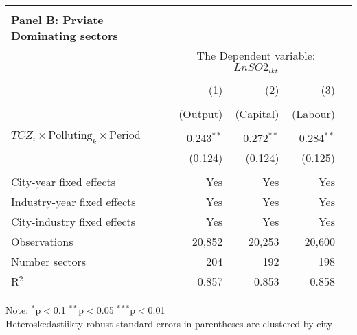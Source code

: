 \documentclass[12pt]{article}
\begin{document}
\begin{table}[!htb]
\begin{adjustbox}{width=\textwidth, totalheight=\baselineskip,keepaspectratio}
\begin{tabular}{lrrrr}
        \bottomrule
        \\ %
        \multicolumn{1}{l}{\textbf{Panel B: Prviate Dominating sectors}} \\
        \toprule
        & \multicolumn{3}{c}{The Dependent variable: $Ln SO2_{ikt}$} \\
        \cline{2-4}
        \\[-1.8ex] & (1) & (2) & (3)\\
        \\[-1.8ex] &  (Output)& (Capital) & (Labour) \\
        \hline \\[-1.8ex]
        $TCZ_i \times \text{Polluting}_k \times \text{Period}$ & $-$0.243$^{**}$ & $-$0.272$^{**}$ & $-$0.284$^{**}$ \\
                                                            & (0.124)         & (0.124)         & (0.125)         \\
        \hline \\[-1.8ex]
        City-year fixed effects                             & Yes             & Yes             & Yes             \\
        Industry-year fixed effects                         & Yes             & Yes             & Yes             \\
        City-industry fixed effects                         & Yes             & Yes             & Yes             \\
        Observations                                        & 20,852          & 20,253          & 20,600          \\
        Number sectors                                      & 204             & 192             & 198             \\
        R$^{2}$                                             & 0.857           & 0.853           & 0.858           \\
    \end{tabular}
    \end{adjustbox}
    \begin{tablenotes}
      \small
      \item 
      Note: $^{*}$p$<$0.1 $^{**}$p$<$0.05 $^{***}$p$<$0.01 \\
      Heteroskedastiikty-robust standard errors in parentheses are clustered by city \\
    \end{tablenotes}
\end{table}
\end{document}
